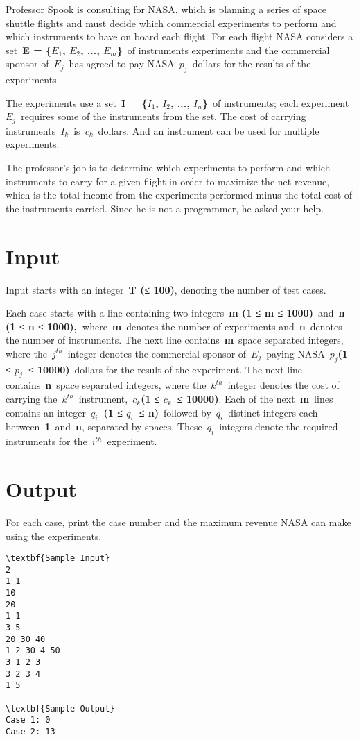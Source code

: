 

Professor Spook is consulting for NASA, which is planning a series of space shuttle flights and must decide which commercial experiments to perform and which instruments to have on board each flight. For each flight NASA considers a set \textbf{E = \{$E_{1}$, $E_{2}$, ..., $E_{m}$\}} of instruments experiments and the commercial sponsor of \textbf{$E_{j}$} has agreed to pay NASA \textbf{$p_{j}$} dollars for the results of the experiments.

The experiments use a set \textbf{I = \{$I_{1}$, $I_{2}$, ..., $I_{n}$\}} of instruments; each experiment \textbf{$E_{j}$} requires some of the instruments from the set. The cost of carrying instruments \textbf{$I_{k}$} is \textbf{$c_{k}$} dollars. And an instrument can be used for multiple experiments.

The professor's job is to determine which experiments to perform and which instruments to carry for a given flight in order to maximize the net revenue, which is the total income from the experiments performed minus the total cost of the instruments carried. Since he is not a programmer, he asked your help.

\section{Input}

Input starts with an integer \textbf{T (}\textbf{≤ 100)}, denoting the number of test cases.

Each case starts with a line containing two integers \textbf{m (1 ≤ m ≤ 1000)} and \textbf{n (1 ≤ n ≤ 1000), }where \textbf{m} denotes the number of experiments and \textbf{n} denotes the number of instruments. The next line contains \textbf{m} space separated integers, where the \textbf{$j^{th}$} integer denotes the commercial sponsor of \textbf{$E_{j}$} paying NASA \textbf{$p_{j}$(1 ≤ $p_{j}$ ≤ 10000)} dollars for the result of the experiment. The next line contains \textbf{n} space separated integers, where the \textbf{$k^{th}$} integer denotes the cost of carrying the \textbf{$k^{th}$} instrument, \textbf{$c_{k}$(1 ≤ $c_{k}$ ≤ 10000)}. Each of the next \textbf{m} lines contains an integer \textbf{$q_{i}$ (1 ≤ $q_{i}$ ≤ n)} followed by \textbf{$q_{i}$} distinct integers each between \textbf{1} and \textbf{n}, separated by spaces. These \textbf{$q_{i}$} integers denote the required instruments for the \textbf{$i^{th}$} experiment.

\section{Output}

For each case, print the case number and the maximum revenue NASA can make using the experiments.
\begin{verbatim}
\textbf{Sample Input}
2
1 1
10
20
1 1
3 5
20 30 40
1 2 30 4 50
3 1 2 3
3 2 3 4
1 5

\textbf{Sample Output}
Case 1: 0
Case 2: 13\end{verbatim}
